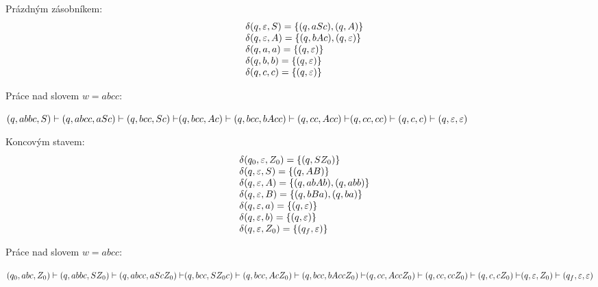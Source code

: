 \begin{multicols}{2}
    
    Prázdným zásobníkem: 
    \[
    \begin{array}{l l}
        & \delta(q, \varepsilon, S) = \left\lbrace (q, aSc), (q, A) \right\rbrace \\
        & \delta(q, \varepsilon, A) = \left\lbrace (q, bAc), (q, \varepsilon) \right\rbrace \\
        & \delta(q, a, a) = \left\lbrace (q, \varepsilon) \right\rbrace \\
        & \delta(q, b, b) = \left\lbrace (q, \varepsilon) \right\rbrace \\ 
        & \delta(q, c, c) = \left\lbrace (q, \varepsilon) \right\rbrace \\ 
    \end{array}
    \]

    Práce nad slovem $w = abcc$:

    $
    {(q, abbc, S) \vdash (q, abcc, aSc) \vdash (q, bcc, Sc) \vdash}\\
    {(q, bcc, Ac) \vdash (q, bcc, bAcc) \vdash (q, cc, Acc) \vdash}\\ 
    {(q, cc, cc) \vdash (q, c, c) \vdash(q, \varepsilon, \varepsilon)}
    $

\columnbreak

    Koncovým stavem: 
    \[
    \begin{array}{l l}
        & \delta(q_0, \varepsilon, Z_0) = \left\lbrace (q, SZ_0) \right\rbrace \\
        & \delta(q, \varepsilon, S) = \left\lbrace (q, AB) \right\rbrace \\
        & \delta(q, \varepsilon, A) = \left\lbrace (q, abAb), (q, abb) \right\rbrace \\
        & \delta(q, \varepsilon, B) = \left\lbrace (q, bBa), (q, ba) \right\rbrace \\
        & \delta(q, \varepsilon, a) = \left\lbrace (q, \varepsilon) \right\rbrace \\
        & \delta(q, \varepsilon, b) = \left\lbrace (q, \varepsilon) \right\rbrace \\ 
        & \delta(q, \varepsilon, Z_0) = \left\lbrace (q_f, \varepsilon) \right\rbrace \\ 
    \end{array}
    \]

    Práce nad slovem $w = abcc$:

    $
    {(q_0, abc, Z_0) \vdash (q, abbc, SZ_0) \vdash (q, abcc, aScZ_0) \vdash}\\
    {(q, bcc, SZ_0c) \vdash (q, bcc, AcZ_0) \vdash (q, bcc, bAccZ_0) \vdash}\\
    {(q, cc, AccZ_0) \vdash ( q, cc, ccZ_0) \vdash (q, c, cZ_0) \vdash}\\
    (q, \varepsilon, Z_0) \vdash (q_f, \varepsilon, \varepsilon)
    $
\end{multicols}

